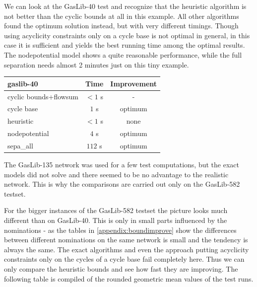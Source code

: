 We can look at the GasLib-40 test and recognize that the heuristic algorithm is not better than the cyclic bounds at 
all in this example. All other algorithms found the optimum solution instead, but with very different timings. Though 
using acyclicity constraints only on a cycle base is not optimal in general, in this case it is sufficient and yields 
the best running time among the optimal results. The nodepotential model shows a quite reasonable performance, while 
the full separation needs almost 2 minutes just on this tiny example.

\begin{center}

\begin{tabular}{ l | c | c }
\textbf{gaslib-40} & Time & Improvement\\
\hline
 cyclic bounds+flowsum& $<1$ s& - \\
 cycle base& $1$ s & optimum\\
 heuristic& $<1$ s& none\\
 nodepotential& $4$ s & optimum\\ 
 sepa\_all& $112$ s& optimum\\
\end{tabular} 
\end{center}

The GasLib-135 network was used for a few test computations, but the exact models did not solve and there seemed to be 
no advantage to the realistic network. This is why the comparisons are carried out only on the GasLib-582 testset.

For the bigger instances of the GasLib-582 testset the picture looks much different than on GasLib-40. This is only in 
small parts influenced by the nominations - as the tables in \ref{appendix:boundimprove} show the differences between 
different nominations on the same network is small and the tendency is always the same. The exact algorithms and even 
the approach putting acyclicity constraints only on the cycles of a cycle base fail completely here. Thus we can only 
compare the heuristic bounds and see how fast they are improving. The following table is compiled of the 
rounded geometric mean values of the test runs.

